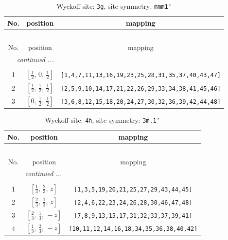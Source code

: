\documentclass[fleqn,8pt]{jsarticle}
\begin{document}
\begin{longtable}{ccc}
\caption{Wyckoff site: {\tt 3g}, site symmetry: {\tt mmm1'}}
 \\
 \hline \hline
No. & position & mapping \\ \hline \endfirsthead

\multicolumn{2}{l}{\tablename\ \thetable{}} \\
 \hline \hline
No. & position & mapping \\ \hline \endhead

 \hline \hline
\multicolumn{2}{r}{\footnotesize\it continued ...} \\ \endfoot

 \hline \hline
\multicolumn{2}{r}{} \\ \endlastfoot

1 & $\left[ \frac{1}{2},\, 0,\, \frac{1}{2} \right]$ & {\tt [1,4,7,11,13,16,19,23,25,28,31,35,37,40,43,47]} \\ \hline
2 & $\left[ \frac{1}{2},\, \frac{1}{2},\, \frac{1}{2} \right]$ & {\tt [2,5,9,10,14,17,21,22,26,29,33,34,38,41,45,46]} \\ \hline
3 & $\left[ 0,\, \frac{1}{2},\, \frac{1}{2} \right]$ & {\tt [3,6,8,12,15,18,20,24,27,30,32,36,39,42,44,48]} \\
\end{longtable}
\renewcommand{\arraystretch}{1.2}
\begin{longtable}{ccc}
\caption{Wyckoff site: {\tt 4h}, site symmetry: {\tt 3m.1'}}
 \\
 \hline \hline
No. & position & mapping \\ \hline \endfirsthead

\multicolumn{2}{l}{\tablename\ \thetable{}} \\
 \hline \hline
No. & position & mapping \\ \hline \endhead

 \hline \hline
\multicolumn{2}{r}{\footnotesize\it continued ...} \\ \endfoot

 \hline \hline
\multicolumn{2}{r}{} \\ \endlastfoot

1 & $\left[ \frac{1}{3},\, \frac{2}{3},\, z \right]$ & {\tt [1,3,5,19,20,21,25,27,29,43,44,45]} \\ \hline
2 & $\left[ \frac{2}{3},\, \frac{1}{3},\, z \right]$ & {\tt [2,4,6,22,23,24,26,28,30,46,47,48]} \\ \hline
3 & $\left[ \frac{2}{3},\, \frac{1}{3},\, - z \right]$ & {\tt [7,8,9,13,15,17,31,32,33,37,39,41]} \\ \hline
4 & $\left[ \frac{1}{3},\, \frac{2}{3},\, - z \right]$ & {\tt [10,11,12,14,16,18,34,35,36,38,40,42]} \\
\end{longtable}
\end{document}
